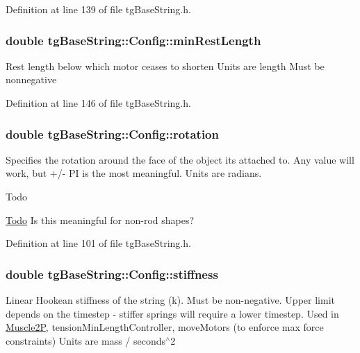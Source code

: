 Definition at line 139 of file tg\-Base\-String.\-h.

\hypertarget{structtg_base_string_1_1_config_a487963813055e418a148e65d2a3a0d9e}{
\subsubsection[{min\-Rest\-Length}]{\setlength{\rightskip}{0pt plus 5cm}double tg\-Base\-String\-::\-Config\-::min\-Rest\-Length}}\label{structtg_base_string_1_1_config_a487963813055e418a148e65d2a3a0d9e}
Rest length below which motor ceases to shorten Units are length Must be nonnegative 

Definition at line 146 of file tg\-Base\-String.\-h.

\hypertarget{structtg_base_string_1_1_config_adcbba0b56f674d0c38b1fc98e99e3d64}{
\subsubsection[{rotation}]{\setlength{\rightskip}{0pt plus 5cm}double tg\-Base\-String\-::\-Config\-::rotation}}\label{structtg_base_string_1_1_config_adcbba0b56f674d0c38b1fc98e99e3d64}
Specifies the rotation around the face of the object its attached to. Any value will work, but +/-\/ P\-I is the most meaningful. Units are radians. \begin{DoxyRefDesc}{Todo}
\item[\hyperlink{todo__todo000008}{Todo}]Is this meaningful for non-\/rod shapes? \end{DoxyRefDesc}


Definition at line 101 of file tg\-Base\-String.\-h.

\hypertarget{structtg_base_string_1_1_config_a7f0c0e1ddae4ca1594d50bcc9559250e}{
\subsubsection[{stiffness}]{\setlength{\rightskip}{0pt plus 5cm}double tg\-Base\-String\-::\-Config\-::stiffness}}\label{structtg_base_string_1_1_config_a7f0c0e1ddae4ca1594d50bcc9559250e}
Linear Hookean stiffness of the string (k). Must be non-\/negative. Upper limit depends on the timestep -\/ stiffer springs will require a lower timestep. Used in \hyperlink{class_muscle2_p}{Muscle2\-P}, tension\-Min\-Length\-Controller, move\-Motors (to enforce max force constraints) Units are mass / seconds$^\wedge$2 

